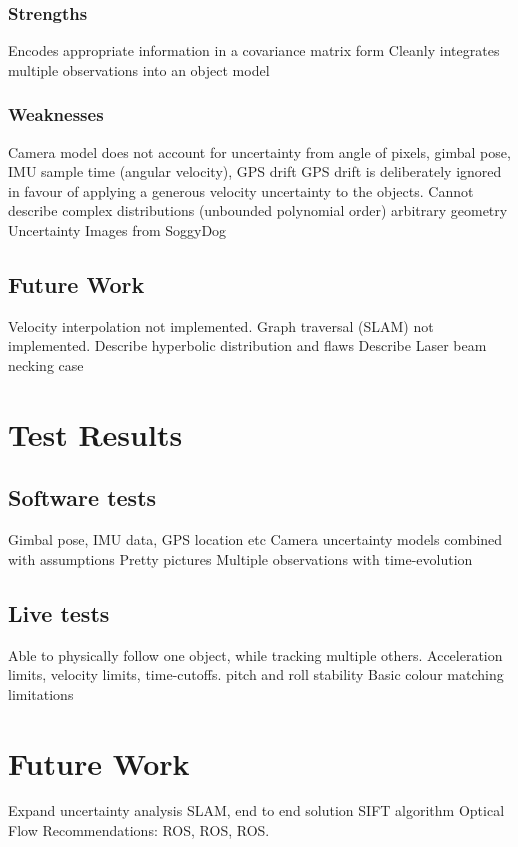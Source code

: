 \documentclass[a4paper, 11pt, titlepage]{article}
\begin{document}
		\subsubsection{Strengths}
			Encodes appropriate information in a covariance matrix form
			Cleanly integrates multiple observations into an object model
		\subsubsection{Weaknesses}
			Camera model does not account for uncertainty from angle of pixels, gimbal pose, IMU sample time (angular velocity), GPS drift
			GPS drift is deliberately ignored in favour of applying a generous velocity uncertainty to the objects.
			Cannot describe complex distributions (unbounded polynomial order)
				arbitrary geometry Uncertainty Images from SoggyDog
	\subsection{Future Work}
			Velocity interpolation not implemented.
			Graph traversal (SLAM) not implemented.
			Describe hyperbolic distribution and flaws
			Describe Laser beam necking case


\section{Test Results}

	\subsection{Software tests}
		Gimbal pose, IMU data, GPS location etc
		Camera uncertainty models combined with assumptions
		Pretty pictures
			Multiple observations with time-evolution

	\subsection{Live tests}
		Able to physically follow one object, while tracking multiple others.
		Acceleration limits, velocity limits, time-cutoffs.
		pitch and roll stability
		Basic colour matching limitations

\section{Future Work}
	Expand uncertainty analysis
	SLAM, end to end solution
	SIFT algorithm
	Optical Flow
	Recommendations:
		ROS, ROS, ROS.
\end{document}
